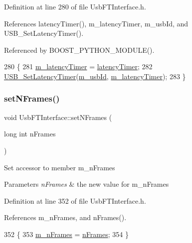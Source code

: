 Definition at line 280 of file Usb\+F\+T\+Interface.\+h.



References latency\+Timer(), m\+\_\+latency\+Timer, m\+\_\+usb\+Id, and U\+S\+B\+\_\+\+Set\+Latency\+Timer().



Referenced by B\+O\+O\+S\+T\+\_\+\+P\+Y\+T\+H\+O\+N\+\_\+\+M\+O\+D\+U\+L\+E().


\begin{DoxyCode}
280                                                     \{
281     \hyperlink{classUsbFTInterface_a0eefe6f2cee132da70176562cd126718}{m\_latencyTimer} = \hyperlink{classUsbFTInterface_a4fa70ce4a4cd4f8f01cdeb4835f11276}{latencyTimer};
282     \hyperlink{LALUsbML_8h_a1a6965b64c7de773855cbdeaf2a62a27}{USB\_SetLatencyTimer}(\hyperlink{classUsbFTInterface_a91df5c0547e8be460bc087e27afe05aa}{m\_usbId}, \hyperlink{classUsbFTInterface_a0eefe6f2cee132da70176562cd126718}{m\_latencyTimer});
283   \}
\end{DoxyCode}
\mbox{\label{classUsbFTInterface_a247a19741032fa0f330cc3f6c17ed08b}} 
\subsubsection{\texorpdfstring{set\+N\+Frames()}{setNFrames()}}
{\footnotesize\ttfamily void Usb\+F\+T\+Interface\+::set\+N\+Frames (\begin{DoxyParamCaption}\item[{long int}]{n\+Frames }\end{DoxyParamCaption})\hspace{0.3cm}{\ttfamily [inline]}}

Set accessor to member m\+\_\+n\+Frames 
\begin{DoxyParams}{Parameters}
{\em n\+Frames} & the new value for m\+\_\+n\+Frames \\
\hline
\end{DoxyParams}


Definition at line 352 of file Usb\+F\+T\+Interface.\+h.



References m\+\_\+n\+Frames, and n\+Frames().


\begin{DoxyCode}
352                                      \{
353     \hyperlink{classUsbFTInterface_a40770504afc4173034c8a8d6c5f5962c}{m\_nFrames} = \hyperlink{classUsbFTInterface_a694f5cb1d38d4369a597ad6761762c0e}{nFrames};
354   \}
\end{DoxyCode}
\mbox{\label{classUsbFTInterface_a6f31debb1d94a65deb3acb72e3608f27}} 
